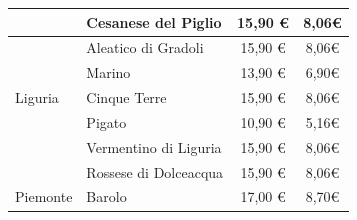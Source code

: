 \documentclass[12pt, a4paper]{article}
\begin{document}
\begin{longtable}{@{}|l|l|c|c|}
                         & Cesanese del Piglio                                                       & 15,90 €                                                         & 8,06€                                                                                                         \\ \hline
                         & Aleatico di Gradoli                                                       & 15,90 €                                                         & 8,06€                                                                                                         \\ \hline
                         & Marino                                                                    & 13,90 €                                                         & 6,90€                                                                                                         \\ \hline
    Liguria              & Cinque Terre                                                              & 15,90 €                                                         & 8,06€                                                                                                         \\ \hline
                         & Pigato                                                                    & 10,90 €                                                         & 5,16€                                                                                                         \\ \hline
                         & Vermentino di Liguria                                                     & 15,90 €                                                         & 8,06€                                                                                                         \\ \hline
                         & Rossese di Dolceacqua                                                     & 15,90 €                                                         & 8,06€                                                                                                         \\ \hline
    Piemonte             & Barolo                                                                    & 17,00 €                                                         & 8,70€                                                                                                         \\ \hline

\end{longtable}
\end{document}
